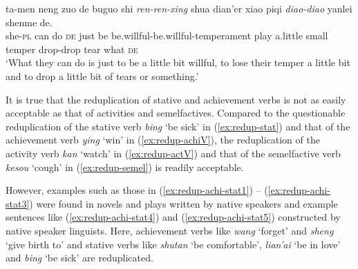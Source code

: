\ex
\gll ta-men neng zuo de buguo shi \textit{ren-ren-xing} shua dian'er xiao piqi \textit{diao-diao} yanlei shenme de.\\
she-\textsc{pl} can do \textsc{de} just be be.willful-be.willful-temperament play a.little small temper drop-drop tear what \textsc{de}\\ 
\glt `What they can do is just to be a little bit willful, to lose their temper a little bit and to drop a little bit of tears or something.'
\z
\z

It is true that  the reduplication of stative and achievement verbs is not as easily acceptable as that of activities and semelfactives.
Compared to the questionable reduplication of the stative verb \textit{bing} `be sick' in (\ref{ex:redup-stat})
and that of the achievement verb \textit{ying} `win' in (\ref{ex:redup-achiV}), 
the reduplication of the activity verb \textit{kan} `watch' in (\ref{ex:redup-actV})
and that of the semelfactive verb \textit{kesou} `cough' in (\ref{ex:redup-semel}) is readily acceptable.

\ea
{}\label{ex:redup-stat}

\label{ex:redup-achiV}

\label{ex:redup-actV}

\label{ex:redup-semel}
\z
\z

However, examples such as those in (\ref{ex:redup-achi-stat1}) -- (\ref{ex:redup-achi-stat3}) were found in novels and plays written by native speakers and example sentences like (\ref{ex:redup-achi-stat4}) and (\ref{ex:redup-achi-stat5}) constructed by native speaker linguists.
Here, achievement verbs like \textit{wang} `forget' and \textit{sheng} `give birth to' and stative verbs like \textit{shutan} `be comfortable', \textit{lian'ai} `be in love' and \textit{bing} `be sick' are reduplicated.

